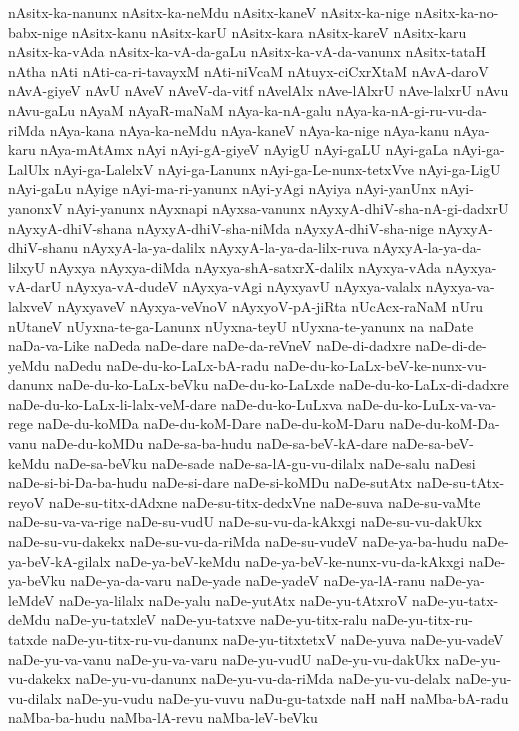 {nAsitx-ka-nanunx
nAsitx-ka-neMdu
nAsitx-kaneV
nAsitx-ka-nige
nAsitx-ka-no-babx-nige
nAsitx-kanu
nAsitx-karU
nAsitx-kara
nAsitx-kareV
nAsitx-karu
nAsitx-ka-vAda
nAsitx-ka-vA-da-gaLu
nAsitx-ka-vA-da-vanunx
nAsitx-tataH
nAtha
nAti
nAti-ca-ri-tavayxM
nAti-niVcaM
nAtuyx-ciCxrXtaM
nAvA-daroV
nAvA-giyeV
nAvU
nAveV
nAveV-da-vitf
nAvelAlx
nAve-lAlxrU
nAve-lalxrU
nAvu
nAvu-gaLu
nAyaM
nAyaR-maNaM
nAya-ka-nA-galu
nAya-ka-nA-gi-ru-vu-da-riMda
nAya-kana
nAya-ka-neMdu
nAya-kaneV
nAya-ka-nige
nAya-kanu
nAya-karu
nAya-mAtAmx
nAyi
nAyi-gA-giyeV
nAyigU
nAyi-gaLU
nAyi-gaLa
nAyi-ga-LalUlx
nAyi-ga-LalelxV
nAyi-ga-Lanunx
nAyi-ga-Le-nunx-tetxVve
nAyi-ga-LigU
nAyi-gaLu
nAyige
nAyi-ma-ri-yanunx
nAyi-yAgi
nAyiya
nAyi-yanUnx
nAyi-yanonxV
nAyi-yanunx
nAyxnapi
nAyxsa-vanunx
nAyxyA-dhiV-sha-nA-gi-dadxrU
nAyxyA-dhiV-shana
nAyxyA-dhiV-sha-niMda
nAyxyA-dhiV-sha-nige
nAyxyA-dhiV-shanu
nAyxyA-la-ya-dalilx
nAyxyA-la-ya-da-lilx-ruva
nAyxyA-la-ya-da-lilxyU
nAyxya
nAyxya-diMda
nAyxya-shA-satxrX-dalilx
nAyxya-vAda
nAyxya-vA-darU
nAyxya-vA-dudeV
nAyxya-vAgi
nAyxyavU
nAyxya-valalx
nAyxya-va-lalxveV
nAyxyaveV
nAyxya-veVnoV
nAyxyoV-pA-jiRta
nUcAcx-raNaM
nUru
nUtaneV
nUyxna-te-ga-Lanunx
nUyxna-teyU
nUyxna-te-yanunx
na
naDate
naDa-va-Like
naDeda
naDe-dare
naDe-da-reVneV
naDe-di-dadxre
naDe-di-de-yeMdu
naDedu
naDe-du-ko-LaLx-bA-radu
naDe-du-ko-LaLx-beV-ke-nunx-vu-danunx
naDe-du-ko-LaLx-beVku
naDe-du-ko-LaLxde
naDe-du-ko-LaLx-di-dadxre
naDe-du-ko-LaLx-li-lalx-veM-dare
naDe-du-ko-LuLxva
naDe-du-ko-LuLx-va-va-rege
naDe-du-koMDa
naDe-du-koM-Dare
naDe-du-koM-Daru
naDe-du-koM-Da-vanu
naDe-du-koMDu
naDe-sa-ba-hudu
naDe-sa-beV-kA-dare
naDe-sa-beV-keMdu
naDe-sa-beVku
naDe-sade
naDe-sa-lA-gu-vu-dilalx
naDe-salu
naDesi
naDe-si-bi-Da-ba-hudu
naDe-si-dare
naDe-si-koMDu
naDe-sutAtx
naDe-su-tAtx-reyoV
naDe-su-titx-dAdxne
naDe-su-titx-dedxVne
naDe-suva
naDe-su-vaMte
naDe-su-va-va-rige
naDe-su-vudU
naDe-su-vu-da-kAkxgi
naDe-su-vu-dakUkx
naDe-su-vu-dakekx
naDe-su-vu-da-riMda
naDe-su-vudeV
naDe-ya-ba-hudu
naDe-ya-beV-kA-gilalx
naDe-ya-beV-keMdu
naDe-ya-beV-ke-nunx-vu-da-kAkxgi
naDe-ya-beVku
naDe-ya-da-varu
naDe-yade
naDe-yadeV
naDe-ya-lA-ranu
naDe-ya-leMdeV
naDe-ya-lilalx
naDe-yalu
naDe-yutAtx
naDe-yu-tAtxroV
naDe-yu-tatx-deMdu
naDe-yu-tatxleV
naDe-yu-tatxve
naDe-yu-titx-ralu
naDe-yu-titx-ru-tatxde
naDe-yu-titx-ru-vu-danunx
naDe-yu-titxtetxV
naDe-yuva
naDe-yu-vadeV
naDe-yu-va-vanu
naDe-yu-va-varu
naDe-yu-vudU
naDe-yu-vu-dakUkx
naDe-yu-vu-dakekx
naDe-yu-vu-danunx
naDe-yu-vu-da-riMda
naDe-yu-vu-delalx
naDe-yu-vu-dilalx
naDe-yu-vudu
naDe-yu-vuvu
naDu-gu-tatxde
naH
naH‌
naMba-bA-radu
naMba-ba-hudu
naMba-lA-revu
naMba-leV-beVku
}
